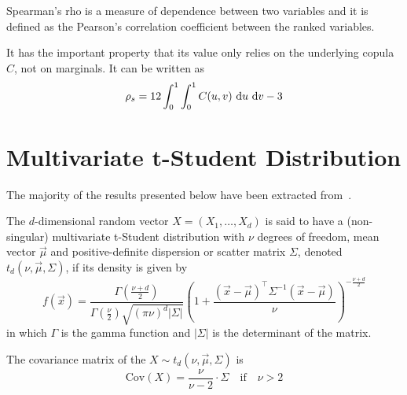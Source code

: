 \documentclass[11pt,fleqn]{book} %
\begin{document}
\begin{definition}
	Spearman's rho is a measure of dependence between two variables and 
	it is defined as the Pearson's correlation coefficient between the 
	ranked variables.
	
	It has the important property that its value only relies on the underlying 
	copula $C$, not on marginals. It can be written as
	\begin{displaymath}
		\rho_s = 12 \displaystyle \int_0^1 \int_0^1 C(u,v) \mathop{\,\mathrm{{}d}}\mathopen{} u \mathop{\,\mathrm{{}d}}\mathopen{} v -3
	\end{displaymath}
\end{definition}

\section{Multivariate t-Student Distribution}
\label{ap:mtsd}

The majority of the results presented below have been extracted 
from~\cite{kotz:2004,demarta:2005}.

\begin{definition}
	The $d$-dimensional random vector $X=(X_1,\dots,X_d)$ is said to have a 
	(non-singular) multivariate t-Student distribution with $\nu$ degrees of 
	freedom, mean vector $\vec{\mu}$ and positive-definite dispersion or 
	scatter matrix $\Sigma$, denoted $t_d(\nu,\vec{\mu},\Sigma)$, if its 
	density is given by
	\begin{displaymath}
		f(\vec{x})=\frac{\Gamma\left(\frac{\nu+d}{2}\right)}
		{\Gamma\left(\frac{\nu}{2}\right)\sqrt{(\pi \nu)^d |\Sigma|}}
		\left(
		1+ \frac{(\vec{x}-\vec{\mu})^\top\Sigma^{-1}(\vec{x}-\vec{\mu})}{\nu}
		\right)^{-\frac{\nu+d}{2}}
	\end{displaymath}
	in which $\Gamma$ is the gamma function and $|\Sigma|$ is the 
	determinant of the matrix.
\end{definition}

\begin{proposition}
	The covariance matrix of the $X \sim t_d(\nu,\vec{\mu},\Sigma)$ is
	\begin{displaymath}
		\text{Cov}(X) = \frac{\nu}{\nu-2} \cdot \Sigma \quad \text{if} 
		\quad \nu > 2
	\end{displaymath}
\end{proposition}
\end{document}
